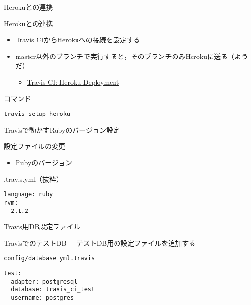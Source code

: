 \documentclass[t, aspectratio=169]{beamer}
\begin{document}
\begin{frame}[fragile,label=sec-7-3-3]{Herokuとの連携}
 \begin{block}{Herokuとの連携}
\begin{itemize}
\item Travis CIからHerokuへの接続を設定する
\item master以外のブランチで実行すると，そのブランチのみHerokuに送る（ようだ）
\begin{itemize}
\item \href{http://docs.travis-ci.com/user/deployment/heroku/}{Travis CI: Heroku Deployment}
\end{itemize}
\end{itemize}
\end{block}

\begin{block}{コマンド}
\begin{verbatim}
travis setup heroku
\end{verbatim}
\end{block}
\end{frame}
\begin{frame}[fragile,label=sec-7-3-4]{Travisで動かすRubyのバージョン設定}
 \begin{block}{設定ファイルの変更}
\begin{itemize}
\item Rubyのバージョン
\end{itemize}
\end{block}

\begin{block}{.travis.yml（抜粋）}
\begin{verbatim}
language: ruby
rvm:
- 2.1.2
\end{verbatim}
\end{block}
\end{frame}
\begin{frame}[fragile,label=sec-7-3-5]{Travis用DB設定ファイル}
 \begin{block}{TravisでのテストDB}
− テストDB用の設定ファイルを追加する
\end{block}

\begin{block}{\texttt{config/database.yml.travis}}
\begin{verbatim}
test:
  adapter: postgresql
  database: travis_ci_test
  username: postgres
\end{verbatim}
\end{block}
\end{frame}
\end{document}

